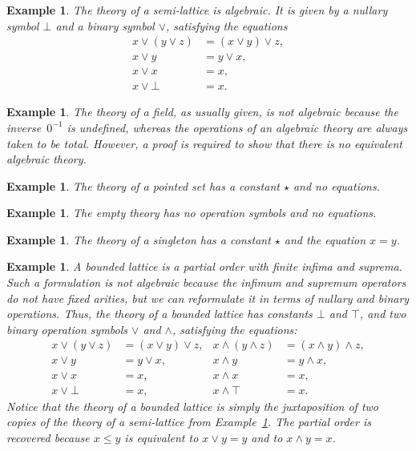 \documentclass{amsart}
\newtheorem{example}[definition]{Example}
\begin{document}
\begin{example}
  \label{ex:semi-lattice}
  The theory of a semi-lattice is algebraic. It is given by a nullary symbol $\bot$ and a
  binary symbol $\vee$, satisfying the equations
  \begin{align*}
    x \vee (y \vee z) &= (x \vee y) \vee z,\\
    x \vee y &= y \vee x,\\
    x \vee x &= x,\\
    x \vee \bot &= x.
  \end{align*}
\end{example}

\begin{example}
  \label{ex:field}
  The theory of a field, as usually given, is not algebraic because the inverse~$0^{-1}$
  is undefined, whereas the operations of an algebraic theory are always taken to be
  total. However, a proof is required to show that there is no equivalent algebraic theory.
\end{example}

\begin{example}
  \label{ex:pointed-set}
  The theory of a \emph{pointed set} has a constant $\star$ and no equations.
\end{example}

\begin{example}
  The \emph{empty theory} has no operation symbols and no equations.
\end{example}

\begin{example}
  The theory of a \emph{singleton} has a constant $\star$ and the equation $x = y$.
\end{example}

\begin{example}
  \label{ex:lattice}
  A bounded lattice is a partial order with finite infima and suprema. Such a formulation
  is not algebraic because the infimum and supremum operators do not have fixed arities,
  but we can reformulate it in terms of nullary and binary operations.
  Thus, the theory of a bounded lattice has constants $\bot$ and $\top$, and two binary
  operation symbols $\vee$ and $\wedge$, satisfying the equations:
  \begin{align*}
    x \vee (y \vee z) &= (x \vee y) \vee z,   &      x \wedge (y \wedge z) &= (x \wedge y) \wedge z,\\
    x \vee y &= y \vee x,                     &      x \wedge y &= y \wedge x,\\
    x \vee x &= x,                            &      x \wedge x &= x,\\
    x \vee \bot &= x,                         &      x \wedge \top &= x.
  \end{align*}
  Notice that the theory of a bounded lattice is simply the juxtaposition of two copies of
  the theory of a semi-lattice from Example~\ref{ex:semi-lattice}. The partial order is
  recovered because $x \leq y$ is equivalent to $x \vee y = y$ and to $x \wedge y = x$.
\end{example}
\end{document}
